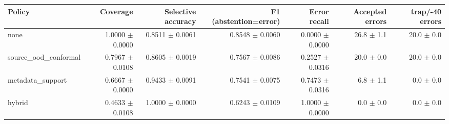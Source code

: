 \begin{tabular}{lrrrrrr}
\hline
Policy & Coverage & Selective accuracy & F1 (abstention=error) & Error recall & Accepted errors & trap/-40 errors \\
\hline
none & 1.0000 $\pm$ 0.0000 & 0.8511 $\pm$ 0.0061 & 0.8548 $\pm$ 0.0060 & 0.0000 $\pm$ 0.0000 & 26.8 $\pm$ 1.1 & 20.0 $\pm$ 0.0 \\
source\_ood\_conformal & 0.7967 $\pm$ 0.0108 & 0.8605 $\pm$ 0.0019 & 0.7567 $\pm$ 0.0086 & 0.2527 $\pm$ 0.0316 & 20.0 $\pm$ 0.0 & 20.0 $\pm$ 0.0 \\
metadata\_support & 0.6667 $\pm$ 0.0000 & 0.9433 $\pm$ 0.0091 & 0.7541 $\pm$ 0.0075 & 0.7473 $\pm$ 0.0316 & 6.8 $\pm$ 1.1 & 0.0 $\pm$ 0.0 \\
hybrid & 0.4633 $\pm$ 0.0108 & 1.0000 $\pm$ 0.0000 & 0.6243 $\pm$ 0.0109 & 1.0000 $\pm$ 0.0000 & 0.0 $\pm$ 0.0 & 0.0 $\pm$ 0.0 \\
\hline
\end{tabular}

